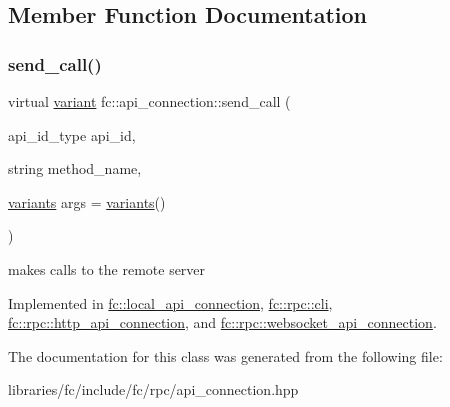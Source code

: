 \subsection{Member Function Documentation}
\mbox{\label{classfc_1_1api__connection_a38d046b1803e1242ce10f36c694b9dea}} 
\subsubsection{\texorpdfstring{send\+\_\+call()}{send\_call()}}
{\footnotesize\ttfamily virtual \mbox{\hyperlink{classfc_1_1variant}{variant}} fc\+::api\+\_\+connection\+::send\+\_\+call (\begin{DoxyParamCaption}\item[{api\+\_\+id\+\_\+type}]{api\+\_\+id,  }\item[{string}]{method\+\_\+name,  }\item[{\mbox{\hyperlink{classstd_1_1vector}{variants}}}]{args = {\ttfamily \mbox{\hyperlink{classstd_1_1vector}{variants}}()} }\end{DoxyParamCaption})\hspace{0.3cm}{\ttfamily [pure virtual]}}

makes calls to the remote server 

Implemented in \mbox{\hyperlink{classfc_1_1local__api__connection_a95994755615aedc3f14f7ac7e5085a00}{fc\+::local\+\_\+api\+\_\+connection}}, \mbox{\hyperlink{classfc_1_1rpc_1_1cli_ab42308885a2df6f53bef3c9407d5e775}{fc\+::rpc\+::cli}}, \mbox{\hyperlink{classfc_1_1rpc_1_1http__api__connection_a3f613b413f6792e3aa631d8e20f4f2c9}{fc\+::rpc\+::http\+\_\+api\+\_\+connection}}, and \mbox{\hyperlink{classfc_1_1rpc_1_1websocket__api__connection_a30eb8e7cdee7c2ca0049f565f100ab14}{fc\+::rpc\+::websocket\+\_\+api\+\_\+connection}}.



The documentation for this class was generated from the following file\+:\begin{DoxyCompactItemize}
\item 
libraries/fc/include/fc/rpc/api\+\_\+connection.\+hpp\end{DoxyCompactItemize}
